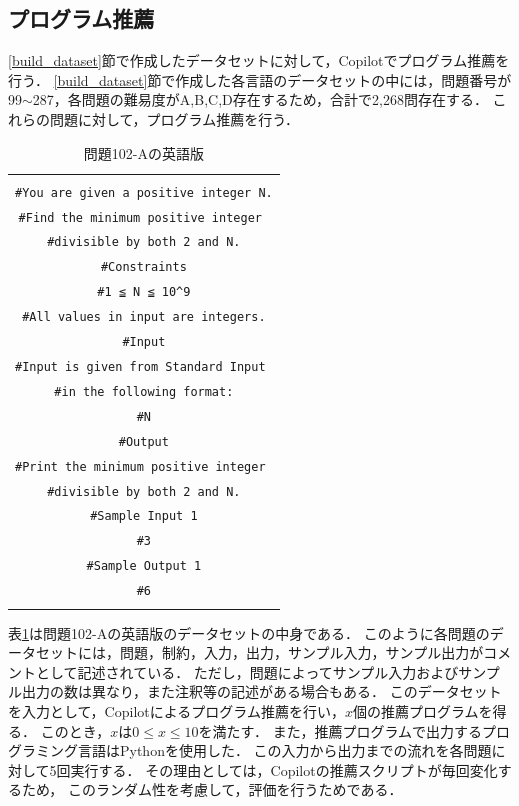   \subsection{プログラム推薦\label{recommend_program}}
    \ref{build_dataset}節で作成したデータセットに対して，Copilotでプログラム推薦を行う．
    \ref{build_dataset}節で作成した各言語のデータセットの中には，問題番号が99${\sim}$287，各問題の難易度がA,B,C,D存在するため，合計で2,268問存在する．
    これらの問題に対して，プログラム推薦を行う．
    
    \begin{table}[t]
      \caption{問題102-Aの英語版}
      \begin{tabular}{c}
        \begin{tabularx}{23zw}{X}
          \hline
          \verb|#Problem Statement| \\
          \verb|#You are given a positive integer N.| \\
          \verb|#Find the minimum positive integer | \\
          \verb|#divisible by both 2 and N.| \\
          \verb|#Constraints| \\
          \verb|#1 ≦ N ≦ 10^9| \\
          \verb|#All values in input are integers.| \\
          \verb|#Input| \\
          \verb|#Input is given from Standard Input | \\
          \verb|#in the following format:| \\
          \verb|#N| \\
          \verb|#Output| \\
          \verb|#Print the minimum positive integer | \\
          \verb|#divisible by both 2 and N.| \\
          \verb|#Sample Input 1| \\
          \verb|#3| \\
          \verb|#Sample Output 1| \\
          \verb|#6| \\
          \hline
        \end{tabularx}
      \end{tabular}
      \label{problem_102_A_en}
    \end{table}

    表\ref{problem_102_A_en}は問題102-Aの英語版のデータセットの中身である．
    このように各問題のデータセットには，問題，制約，入力，出力，サンプル入力，サンプル出力がコメントとして記述されている．
    ただし，問題によってサンプル入力およびサンプル出力の数は異なり，また注釈等の記述がある場合もある．
    このデータセットを入力として，Copilotによるプログラム推薦を行い，$x$個の推薦プログラムを得る．
    このとき，$x$は$0 {\leq} x {\leq} 10$を満たす．
    また，推薦プログラムで出力するプログラミング言語はPythonを使用した．
    この入力から出力までの流れを各問題に対して5回実行する．
    その理由としては，Copilotの推薦スクリプトが毎回変化するため，
    このランダム性を考慮して，評価を行うためである．
    
